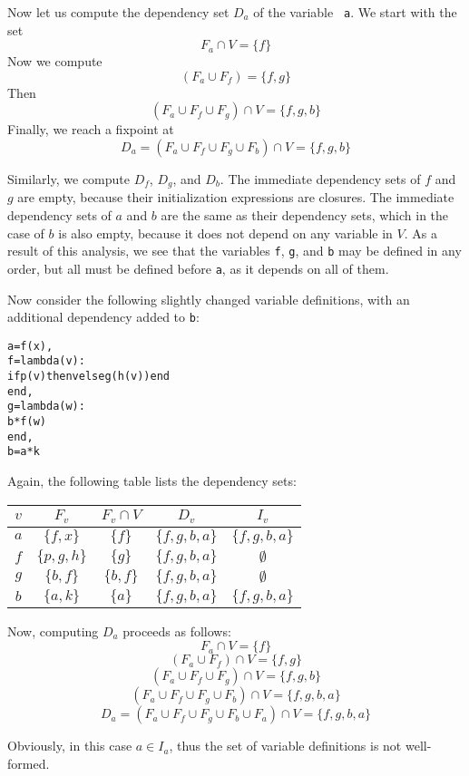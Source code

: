 \begin{example}
Now let us compute the dependency set $D_a$ of the variable {\tt
  a}. We start with the set 
$$F_a \cap V = \{f\}$$
Now we compute 
$$(F_a \cup F_f) = \{f, g\}$$
Then
$$(F_a \cup F_f \cup F_g)\cap V = \{f, g, b\}$$
Finally, we reach a fixpoint at
$$D_a = (F_a \cup F_f \cup F_g \cup F_b)\cap V = \{f, g, b\}$$

Similarly, we compute $D_f$, $D_g$, and $D_b$. The immediate
dependency sets of $f$ and $g$ are empty, because their initialization
expressions are closures. The immediate dependency sets of $a$ and $b$
are the same as their dependency sets, which in the case of $b$ is
also empty, because it does not depend on any variable in $V$. As a
result of this analysis, we see that the variables {\tt f}, {\tt g},
and {\tt b} may be defined in any order, but all must be defined
before {\tt a}, as it depends on all of them.
\end{example}


\begin{example}
Now consider the following slightly changed variable definitions, with
an additional dependency added to {\tt b}:
\begin{alltt}
  a = f(x),
  f = lambda (v) :
      if p(v) then v else g(h(v)) end
  end,
  g = lambda (w) :
      b * f(w)
  end,
  b = a * k
\end{alltt}

Again, the following table lists the dependency sets:

\begin{center}
\begin{tabular}[h]{c|c|c|c|c}
$v$   &    $F_v$   & $F_v \cap V$ & $D_v$  & $I_v$ \\
\hline\hline
$a$   &  $\{f, x\}$ & $\{f\}$   &  $\{f, g, b, a\}$ & $\{f, g, b, a\}$ \\\hline
$f$   &  $\{p, g, h\}$ &  $\{g\}$   & $\{f, g, b, a\}$ & $\emptyset$ \\\hline
$g$   &  $\{b, f\}$ &  $\{b, f\}$   & $\{f, g, b, a\}$ & $\emptyset$ \\\hline
$b$   &  $\{a, k\}$ & $\{a\}$   &  $\{f, g, b, a\}$ & $\{f, g, b, a\}$ \\\hline
\end{tabular}
\end{center} \vspace{4mm}

Now, computing $D_a$ proceeds as follows:
$$F_a \cap V = \{f\}$$
$$(F_a \cup F_f)\cap V = \{f, g\}$$
$$(F_a \cup F_f \cup F_g)\cap V = \{f, g, b\}$$
$$(F_a \cup F_f \cup F_g \cup F_b)\cap V = \{f, g, b, a\}$$
$$D_a = (F_a \cup F_f \cup F_g \cup F_b \cup F_a)\cap V = \{f, g, b, a\}$$

Obviously, in this case $a \in I_a$, thus the set of variable
definitions is not well-formed.
\end{example}









